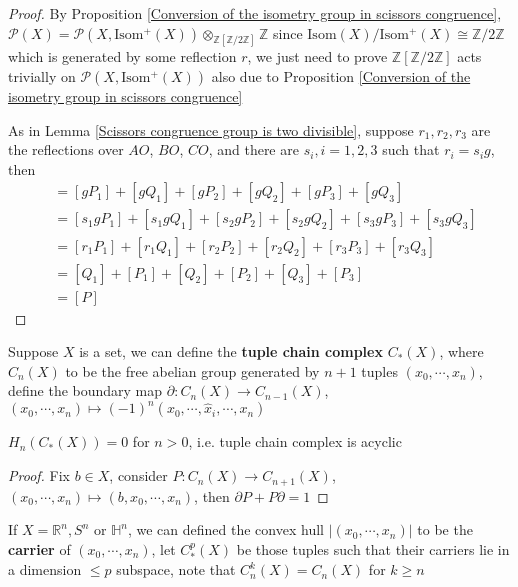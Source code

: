 \documentclass[../main.tex]{subfiles}
\begin{document}
\begin{proof}
By Proposition \ref{Conversion of the isometry group in scissors congruence}, $\mathcal P(X)=\mathcal P(X,\mathrm{Isom^+}(X))\otimes_{\mathbb Z[\mathbb Z/2\mathbb Z]}\mathbb Z$ since $\mathrm{Isom}(X)/\mathrm{Isom^+}(X)\cong\mathbb Z/2\mathbb Z$ which is generated by some reflection $r$, we just need to prove $\mathbb Z[\mathbb Z/2\mathbb Z]$ acts trivially on $\mathcal P(X,\mathrm{Isom^+}(X))$ also due to Proposition \ref{Conversion of the isometry group in scissors congruence} \par
As in Lemma \ref{Scissors congruence group is two divisible}, suppose $r_1,r_2,r_3$ are the reflections over $AO$, $BO$, $CO$, and there are $s_i,i=1,2,3$ such that $r_i=s_ig$, then
\begin{align*}
[gP]&=[gP_1]+[gQ_1]+[gP_2]+[gQ_2]+[gP_3]+[gQ_3] \\
&=[s_1gP_1]+[s_1gQ_1]+[s_2gP_2]+[s_2gQ_2]+[s_3gP_3]+[s_3gQ_3] \\
&=[r_1P_1]+[r_1Q_1]+[r_2P_2]+[r_2Q_2]+[r_3P_3]+[r_3Q_3] \\
&=[Q_1]+[P_1]+[Q_2]+[P_2]+[Q_3]+[P_3] \\
&=[P]
\end{align*}
\end{proof}

\begin{definition}\label{Definition of tuple chain complex}
Suppose $X$ is a set, we can define the \textbf{tuple chain complex} $C_*(X)$, where $C_n(X)$ to be the free abelian group generated by $n+1$ tuples $(x_0,\cdots,x_n)$, define the boundary map $\partial:C_n(X)\to C_{n-1}(X)$, $(x_0,\cdots,x_n)\mapsto(-1)^n(x_0,\cdots,\widehat x_i,\cdots,x_n)$
\end{definition}

\begin{lemma}
$H_n(C_*(X))=0$ for $n>0$, i.e. tuple chain complex is acyclic
\end{lemma}

\begin{proof}
Fix $b\in X$, consider $P:C_n(X)\to C_{n+1}(X)$, $(x_0,\cdots,x_n)\mapsto (b,x_0,\cdots,x_n)$, then $\partial P+P\partial=1$
\end{proof}

\begin{definition}
If $X=\mathbb R^n,S^n$ or $\mathbb H^n$, we can defined the convex hull $|(x_0,\cdots,x_n)|$ to be the \textbf{carrier} of $(x_0,\cdots,x_n)$, let $C_*^p(X)$ be those tuples such that their carriers lie in a dimension $\leq p$ subspace, note that $C^k_n(X)=C_n(X)$ for $k\geq n$
\end{definition}
\end{document}
